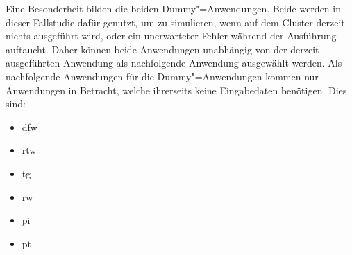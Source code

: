 Eine Besonderheit bilden die beiden Dummy"=Anwendungen.
Beide werden in dieser Fallstudie dafür genutzt, um zu simulieren, wenn auf dem Cluster \zB derzeit nichts ausgeführt wird, oder ein unerwarteter Fehler während der Ausführung auftaucht.
Daher können beide Anwendungen unabhängig von der derzeit ausgeführten Anwendung als nachfolgende Anwendung ausgewählt werden.
Als nachfolgende Anwendungen für die Dummy"=Anwendungen kommen nur Anwendungen in Betracht, welche ihrerseits keine Eingabedaten benötigen. Dies sind:

\begin{itemize}
    \item \acl{dfw}
    \item \acl{rtw}
    \item \acl{tg}
    \item \acl{rw}
    \item \acl{pi}
    \item \acl{pt}
\end{itemize}

